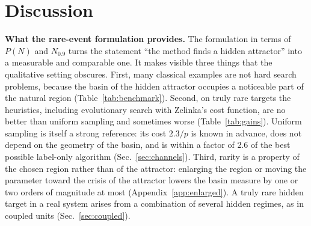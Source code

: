 \section{Discussion}\label{sec:discussion}

\textbf{What the rare-event formulation provides.} The formulation in terms of $P(N)$ and $N_{0.9}$ turns the statement ``the method finds a hidden attractor'' into a measurable and comparable one. It makes visible three things that the qualitative setting obscures. First, many classical examples are not hard search problems, because the basin of the hidden attractor occupies a noticeable part of the natural region (Table~\ref{tab:benchmark}). Second, on truly rare targets the heuristics, including evolutionary search with Zelinka's cost function,\cite{Zelinka2016} are no better than uniform sampling and sometimes worse (Table~\ref{tab:gains}). Uniform sampling is itself a strong reference: its cost $2.3/p$ is known in advance, does not depend on the geometry of the basin, and is within a factor of 2.6 of the best possible label-only algorithm (Sec.~\ref{sec:channels}). Third, rarity is a property of the chosen region rather than of the attractor: enlarging the region or moving the parameter toward the crisis of the attractor lowers the basin measure by one or two orders of magnitude at most (Appendix~\ref{app:enlarged}). A truly rare hidden target in a real system arises from a combination of several hidden regimes, as in coupled units (Sec.~\ref{sec:coupled}).

